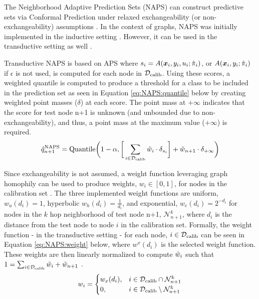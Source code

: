 The Neighborhood Adaptive Prediction Sets (NAPS) can construct predictive sets via Conformal Prediction under relaxed exchangeability (or non-exchangeability) assumptions \cite{barber2023NAPS}. In the context of graphs, NAPS was initially implemented in the inductive setting \cite{clarkson2023distribution}. However, it can be used in the transductive setting as well \cite{zargarbashi23conformal}. 


Transductive NAPS is based on APS where $s_i = A({\bm{x}}_i, y_i, u_i;\hat{\pi}_i)$, or $A({\bm{x}}_i, y_i;\hat{\pi}_i)$ if $\epsilon$ is not used, is computed for each node in ${\mathcal{D}}_{\text{calib}}$. Using these scores, a weighted quantile is computed to produce a threshold for a class to be included in the prediction set as seen in Equation \ref{eq:NAPS:quantile} below by creating weighted point masses ($\delta$) at each score. The point mass at $+\infty$ indicates that the score for test node n+1 is unknown (and unbounded due to non-exchangeability), and thus, a point mass at the maximum value ($+\infty$) is required. 
\begin{align}
    \hat{q}^{\text{NAPS}}_{n+1} = \text{Quantile}\bigg(1-\alpha, \bigg[\sum_{i\in{\mathcal{D}}_{\text{calib}}}\Tilde{w}_{i}\cdot \delta_{s_{i}}\bigg] + \Tilde{w}_{n+1}\cdot \delta_{+\infty}\bigg)
    \label{eq:NAPS:quantile}
\end{align}

Since exchangeability is not assumed, a weight function leveraging graph homophily can be used to produce weights, $w_i\in [0,1]$, for nodes in the calibration set \cite{barber2023NAPS}. The three implemented weight functions are uniform, $w_u(d_i) = 1$, hyperbolic $w_h(d_i) = \frac{1}{d_i}$, and exponential, $w_e(d_i) = 2^{-d_i}$ for nodes in the $k$ hop neighborhood of test node n+1, $\mathcal{N}_{n+1}^k$, where $d_i$ is the distance from the test node to node $i$ in the calibration set. Formally, the weight function - in the transductive setting - for each node, $i\in{\mathcal{D}}_{\text{calib}}$ can be seen in Equation \ref{eq:NAPS:weight} below, where $w^x(d_i)$ is the selected weight function. These weights are then linearly normalized to compute $\Tilde{w}_i$ such that $1 = \sum_{i\in{\mathcal{D}}_{\text{calib}}} \Tilde{w}_i + \Tilde{w}_{n+1}$ \cite{barber2023NAPS}.
\begin{align}
    w_i = \begin{cases}
w_x(d_i), & i\in {\mathcal{D}}_{\text{calib}}\cap\mathcal{N}_{n+1}^k\\
0,& i\in {\mathcal{D}}_{\text{calib}}\setminus\mathcal{N}_{n+1}^k
\end{cases}
    \label{eq:NAPS:weight}
\end{align}

